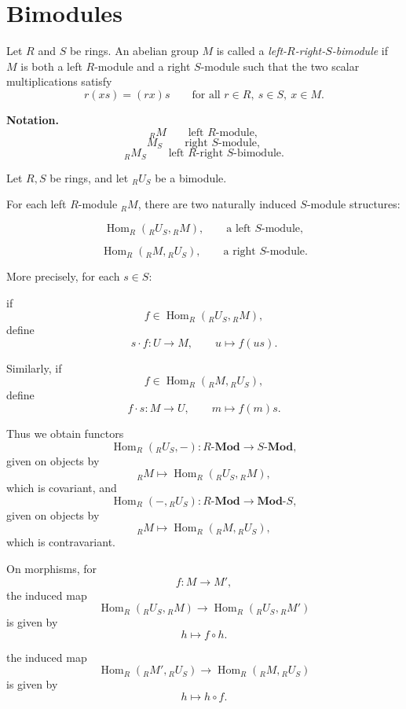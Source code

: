 \section{Bimodules}

\begin{definition}
    Let $R$ and $S$ be rings. An abelian group $M$ is called a \emph{left-$R$-right-$S$-bimodule} if $M$ is both a left $R$-module and a right $S$-module such that the two scalar multiplications satisfy
    \[
        r(xs)=(rx)s
        \qquad
        \text{for all } r\in R,\ s\in S,\ x\in M.
    \]
\end{definition}

\noindent\textbf{Notation.}
\[
    {}_R M \qquad \text{left } R\text{-module},
\]
\[
    M_S \qquad \text{right } S\text{-module},
\]
\[
    {}_R M_S \qquad \text{left } R\text{-right } S\text{-bimodule}.
\]

Let $R,S$ be rings, and let ${}_R U_S$ be a bimodule.

For each left $R$-module ${}_R M$, there are two naturally induced $S$-module structures:

\[
    \operatorname{Hom}_R({}_R U_S, {}_R M),
    \qquad \text{a left } S\text{-module},
\]

\[
    \operatorname{Hom}_R({}_R M, {}_R U_S),
    \qquad \text{a right } S\text{-module}.
\]

More precisely, for each $s\in S$:

if
\[
    f\in \operatorname{Hom}_R({}_R U_S, {}_R M),
\]
define
\[
    s\cdot f: U\to M,\qquad u\mapsto f(us).
\]

Similarly, if
\[
    f\in \operatorname{Hom}_R({}_R M, {}_R U_S),
\]
define
\[
    f\cdot s: M\to U,\qquad m\mapsto f(m)s.
\]

Thus we obtain functors
\[
    \operatorname{Hom}_R({}_R U_S,-): R\text{-}\mathbf{Mod}\longrightarrow S\text{-}\mathbf{Mod},
\]
given on objects by
\[
    {}_R M\longmapsto \operatorname{Hom}_R({}_R U_S, {}_R M),
\]
which is covariant, and
\[
    \operatorname{Hom}_R(-,{}_R U_S): R\text{-}\mathbf{Mod}\longrightarrow \mathbf{Mod}\text{-}S,
\]
given on objects by
\[
    {}_R M\longmapsto \operatorname{Hom}_R({}_R M, {}_R U_S),
\]
which is contravariant.

On morphisms, for
\[
    f:M\to M',
\]
the induced map
\[
    \operatorname{Hom}_R({}_R U_S, {}_R M)\longrightarrow \operatorname{Hom}_R({}_R U_S, {}_R M')
\]
is given by
\[
    h\longmapsto f\circ h.
\]

the induced map
\[
    \operatorname{Hom}_R({}_R M', {}_R U_S)\longrightarrow \operatorname{Hom}_R({}_R M, {}_R U_S)
\]
is given by
\[
    h\longmapsto  h \circ f.
\]

